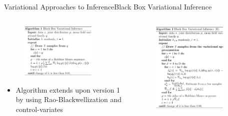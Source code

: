 \documentclass[AERbeamer%
              ,optEnglish%
              ,optBiber%
              ,optBibstyleAlphabetic%
              ,optBeamerClassicFormat%
              ]{AERlatex}%
\begin{document}
\begin{frame}[c]{Variational Approaches to Inference}{Black Box Variational Inference}
    \centering
    \begin{columns}[T]
        \begin{column}{0.48\textwidth}
            \begin{figure}
                \centering
                \includegraphics[width=0.85\textwidth]{VIBBVIAlgo1.png}
            \end{figure}
            \begin{itemize}
                \item Algorithm extends upon version 1 by using Rao-Blackwellization
                      and control-variates
            \end{itemize}
        \end{column}
        \begin{column}{0.48\textwidth}
            \begin{figure}
                \centering
                \includegraphics[width=0.85\textwidth]{VIBBVIAlgo2.png}

\end{figure}
\end{column}
\end{columns}
\end{frame}
\end{document}
